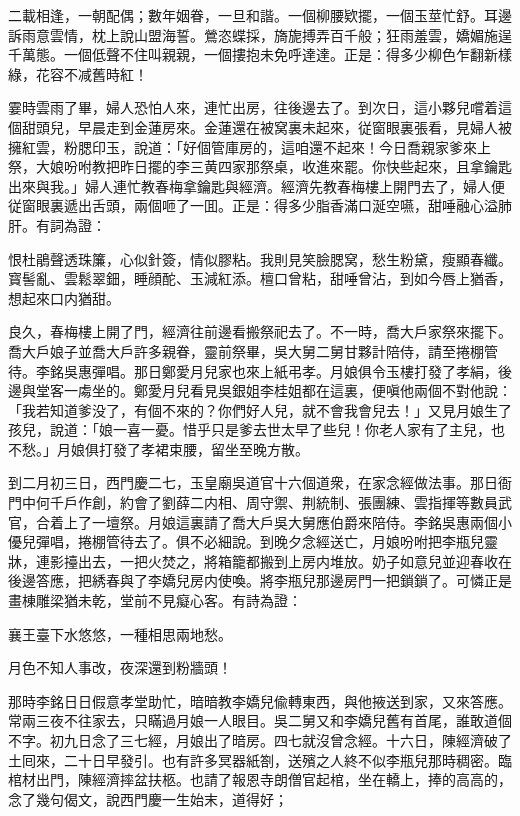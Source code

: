 \begin{myquote}
二載相逢，一朝配偶；數年姻眷，一旦和諧。一個柳腰欵擺，一個玉莖忙舒。耳邊訴雨意雲情，枕上說山盟海誓。鶯恣蝶採，旖旎搏弄百千般；狂雨羞雲，嬌媚施逞千萬態。一個低聲不住叫親親，一個摟抱未免呼達達。正是：得多少柳色乍翻新樣綠，花容不减舊時紅！
\end{myquote}

霎時雲雨了畢，婦人恐怕人來，連忙出房，往後邊去了。到次日，這小夥兒嚐着這個甜頭兒，早晨走到金蓮房來。金蓮還在被窝裏未起來，従窗眼裏張看，見婦人被擁紅雲，粉腮印玉，說道：「好個管庫房的，這咱還不起來！今日喬親家爹來上祭，大娘吩咐教把昨日擺的李三黄四家那祭桌，收進來罷。你快些起來，且拿鑰匙出來與我。」婦人連忙教春梅拿鑰匙與經濟。經濟先教春梅樓上開門去了，婦人便従窗眼裏遞出舌頭，兩個咂了一囬。正是：得多少脂香滿口涎空嚥，甜唾融心溢肺肝。有詞為證：

\begin{myquote}
恨杜鵑聲透珠簾，心似針簽，情似膠粘。我則見笑臉腮窝，愁生粉黛，瘦顯春纖。寳髻亂、雲鬆翠鈿，睡顔酡、玉減紅添。檀口曾粘，甜唾曾沾，到如今唇上猶香，想起來口内猶甜。
\end{myquote}

良久，春梅樓上開了門，經濟往前邊看搬祭祀去了。不一時，喬大戶家祭來擺下。喬大戶娘子並喬大戶許多親眷，靈前祭畢，吳大舅二舅甘夥計陪侍，請至捲棚管待。李銘吳惠彈唱。那日鄭愛月兒家也來上紙弔孝。月娘俱令玉樓打發了孝絹，後邊與堂客一䖏坐的。鄭愛月兒看見吳銀姐李桂姐都在這裏，便嗔他兩個不對他說：「我若知道爹没了，有個不來的？你們好人兒，就不會我會兒去！」又見月娘生了孩兒，說道：「娘一喜一憂。惜乎只是爹去世太早了些兒！你老人家有了主兒，也不愁。」月娘俱打發了孝裙束腰，留坐至晚方散。

到二月初三日，西門慶二七，玉皇廟吳道官十六個道衆，在家念經做法事。那日衙門中何千戶作創，約會了劉薛二内相、周守禦、荆統制、張團練、雲指揮等數員武官，合着上了一壇祭。月娘這裏請了喬大戶吳大舅應伯爵來陪侍。李銘吳惠兩個小優兒彈唱，捲棚管待去了。俱不必細說。到晚夕念經送亡，月娘吩咐把李瓶兒靈牀，連影擡出去，一把火焚之，將箱籠都搬到上房内堆放。奶子如意兒並迎春收在後邊答應，把綉春與了李嬌兒房内使喚。將李瓶兒那邊房門一把鎖鎖了。可憐正是畫棟雕梁猶未乾，堂前不見癡心客。有詩為證：

\begin{myquote}
襄王臺下水悠悠，一種相思兩地愁。

月色不知人事改，夜深還到粉牆頭！
\end{myquote}

那時李銘日日假意孝堂助忙，暗暗教李嬌兒偸轉東西，與他掖送到家，又來答應。常兩三夜不往家去，只瞞過月娘一人眼目。吳二舅又和李嬌兒舊有首尾，誰敢道個不字。初九日念了三七經，月娘出了暗房。四七就沒曾念經。十六日，陳經濟破了土囘來，二十日早發引。也有許多冥器紙劄，送殯之人終不似李瓶兒那時稠密。臨棺材出門，陳經濟摔盆扶柩。也請了報恩寺朗僧官起棺，坐在轎上，捧的高高的，念了幾句偈文，說西門慶一生始末，道得好；

